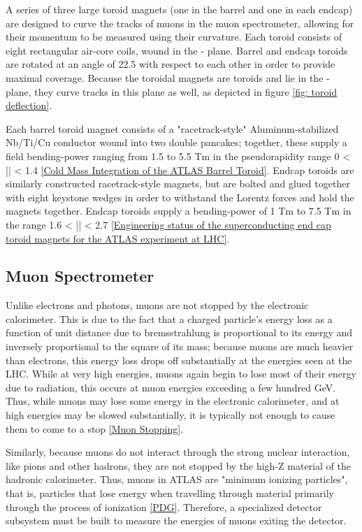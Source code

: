 A series of three large toroid magnets (one in the barrel and one in each endcap) are designed to curve the tracks of muons in the muon spectrometer, allowing for their momentum to be measured using their curvature. Each toroid consists of eight rectangular air-core coils, wound in the \R - \z plane. Barrel and endcap toroids are rotated at an angle of 22.5 \deg with respect to each other in order to provide maximal coverage. Because the toroidal magnets are toroids and lie in the \R - \z plane, they curve tracks in this plane as well, as depicted in figure \ref{fig: toroid deflection}.

Each barrel toroid magnet consists of a "racetrack-style" Aluminum-stabilized Nb/Ti/Cu conductor wound into two double pancakes; together, these supply a field bending-power ranging from 1.5 to 5.5 Tm  in the pseudorapidity range  0 < |\eta | < 1.4 \ref{Cold Mass Integration of the ATLAS Barrel Toroid}. Endcap toroids are similarly constructed racetrack-style magnets, but are bolted and glued together with eight keystone wedges in order to withstand the Lorentz forces and hold the magnets together. Endcap toroids supply a bending-power of 1 Tm to 7.5 Tm in the range 1.6 < |\eta | < 2.7 \ref{Engineering status of the superconducting end cap toroid magnets for the ATLAS experiment at LHC}.

\subsection{Muon Spectrometer} \label{sec:Musyst}
 
Unlike electrons and photons, muons are not stopped by the electronic calorimeter. This is due to the fact that a charged particle's energy loss as a function of unit distance due to bremsstrahlung is proportional to its energy and inversely proportional to the square of its mass; because muons are much heavier than electrons, this energy loss drops off substantially at the energies seen at the LHC. While at very high energies, muons again begin to lose most of their energy due to radiation, this occurs at muon energies exceeding a few hundred GeV. Thus, while muons may lose some energy in the electronic calorimeter, and at high energies may be slowed substantially, it is typically not enough to cause them to come to a stop \ref{Muon Stopping}. 

Similarly, because muons do not interact through the strong nuclear interaction, like pions and other hadrons, they are not stopped by the high-Z material of the hadronic calorimeter. Thus, muons in ATLAS are "minimum ionizing particles", that is, particles that lose energy when travelling through material primarily through the process of ionization \ref{PDG}. Therefore, a specialized detector subsystem must be built to measure the energies of muons exiting the detector.


